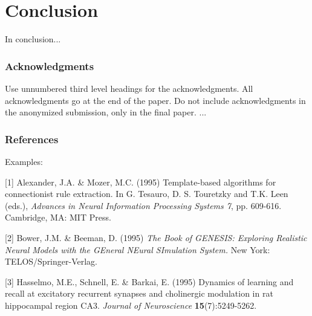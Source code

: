 \documentclass{article} %
\begin{document}
\section{Conclusion}
\label{conclusion}
In conclusion...



\subsubsection*{Acknowledgments}

Use unnumbered third level headings for the acknowledgments. All
acknowledgments go at the end of the paper. Do not include 
acknowledgments in the anonymized submission, only in the 
final paper. 
...

\subsubsection*{References}
Examples: \\

\small{
[1] Alexander, J.A. \& Mozer, M.C. (1995) Template-based algorithms
for connectionist rule extraction. In G. Tesauro, D. S. Touretzky
and T.K. Leen (eds.), {\it Advances in Neural Information Processing
Systems 7}, pp. 609-616. Cambridge, MA: MIT Press.

[2] Bower, J.M. \& Beeman, D. (1995) {\it The Book of GENESIS: Exploring
Realistic Neural Models with the GEneral NEural SImulation System.}
New York: TELOS/Springer-Verlag.

[3] Hasselmo, M.E., Schnell, E. \& Barkai, E. (1995) Dynamics of learning
and recall at excitatory recurrent synapses and cholinergic modulation
in rat hippocampal region CA3. {\it Journal of Neuroscience}
{\bf 15}(7):5249-5262.
}
\end{document}

